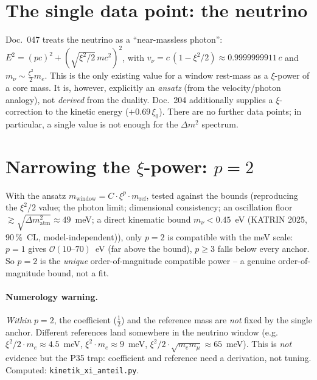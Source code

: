 \section{The single data point: the neutrino}
Doc.~047 treats the neutrino as a \enquote{near-massless photon}: $E^2=(pc)^2+(\sqrt{\xi^2/2}\,
mc^2)^2$, with $v_\nu=c\,(1-\xi^2/2)\approx0.9999999911\,c$ and $m_\nu\sim\tfrac{\xi^2}{2}m_e$.
This is the only existing value for a window rest-mass as a $\xi$-power of a core mass. It is,
however, explicitly an \emph{ansatz} (from the velocity/photon analogy), not \emph{derived} from the
duality. Doc.~204 additionally supplies a $\xi$-correction to the kinetic energy ($+0.69\,\xi_0$).
There are no further data points; in particular, a single value is not enough for the $\Delta m^2$
spectrum.

\section{Narrowing the $\xi$-power: $p=2$}
With the ansatz $m_{\text{window}}=C\cdot\xi^p\cdot m_{\text{ref}}$, tested against the bounds
(reproducing the $\xi^2/2$ value; the photon limit; dimensional consistency; an oscillation floor
$\gtrsim\!\sqrt{\Delta m^2_{\text{atm}}}\approx 49$~meV; a direct kinematic bound $m_\nu<0.45$~eV (KATRIN 2025, 90\,\%~CL, model-independent)),
only $p=2$ is compatible with the meV scale: $p=1$ gives $\mathcal{O}(10\text{--}70)$~eV (far above
the bound), $p\ge3$ falls below every anchor. So $p=2$ is the \emph{unique} order-of-magnitude
compatible power -- a genuine order-of-magnitude bound, not a fit.

\paragraph{Numerology warning.} \emph{Within} $p=2$, the coefficient ($\tfrac12$) and the reference
mass are \emph{not} fixed by the single anchor. Different references land somewhere in the neutrino
window (e.g.\ $\xi^2/2\cdot m_e\approx4.5$~meV, $\xi^2\cdot m_e\approx9$~meV,
$\xi^2/2\cdot\sqrt{m_e m_\mu}\approx65$~meV). This is \emph{not} evidence but the P35 trap:
coefficient and reference need a derivation, not tuning. Computed: \texttt{kinetik\_xi\_anteil.py}.

